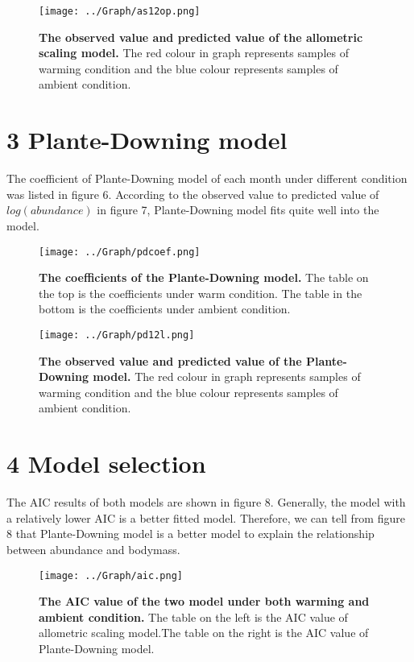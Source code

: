 \documentclass[11pt]{article}
\begin{document}
\begin{linenumbers}
\begin{figure}[H]
  \centering
  \texttt{[image: ../Graph/as12op.png]}
  \caption{\textbf{The observed value and predicted value of
  the allometric scaling model.}
  The red colour in graph represents samples of warming condition and the blue colour represents samples of ambient condition. }
\end{figure}

\section*{3 Plante-Downing model}
The coefficient of Plante-Downing model of each month under different condition was listed in figure 6. According to the observed value to predicted value of $log(abundance)$ in figure 7, Plante-Downing model fits quite well into the model.



\begin{figure}[H]
  \centering
  \texttt{[image: ../Graph/pdcoef.png]}
  \caption{\textbf{The coefficients of the Plante-Downing model.}
   The table on the top is the coefficients under warm condition. The table in the bottom is the coefficients under ambient condition. }
\end{figure}

\begin{figure}[H]
  \centering
  \texttt{[image: ../Graph/pd12l.png]}
  \caption{\textbf{The observed value and predicted value of
  the Plante-Downing model.}
  The red colour in graph represents samples of warming condition and the blue colour represents samples of ambient condition. }
\end{figure}


\section*{4 Model selection}
The AIC results of both models are shown in figure 8. Generally, the model with a relatively lower AIC is a better fitted model. Therefore, we can tell from figure 8 that Plante-Downing model is a better model to explain the relationship between abundance and bodymass.


\begin{figure}[H]
  \centering
  \texttt{[image: ../Graph/aic.png]}
  \caption{\textbf{The AIC value of the two model under both warming and ambient condition.}
  The table on the left is the AIC value of allometric scaling model.The table on the right is the AIC value of Plante-Downing model. }
\end{figure}


\end{linenumbers}
\end{document}
